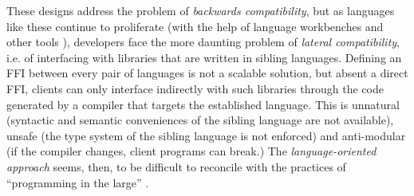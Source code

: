 \documentclass[preprint,10pt]{sigplanconf}
\begin{document}
These designs address the problem of \emph{backwards compat\-ibility}, but as languages like these continue to proliferate (with the help of language workbenches and other tools \cite{erdweg2013state}), developers face the more daunting problem of \emph{lateral compatibility}, i.e. of interfacing with libraries that are written in sibling languages. 
Defining an FFI between every pair of languages is not a scalable solution, but absent a direct FFI, clients can only interface indirectly with such libraries through the code generated by a compiler  that targets the established language. This is unnatural (syntactic and semantic conveniences of the sibling language are not available), unsafe (the type system of the sibling language is not enforced) and anti-modular (if the compiler changes, client programs can break.) The \emph{language-oriented approach} \cite{journals/stp/Ward94} seems, then, to be difficult to reconcile with the practices of ``programming in the large'' \cite{DeRemer76}. %
\end{document}
